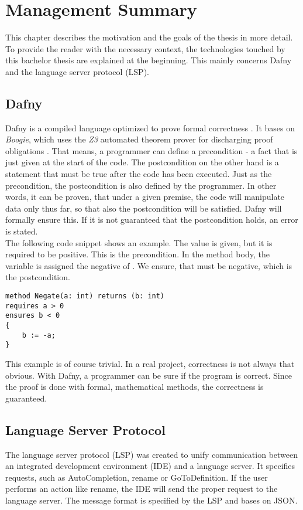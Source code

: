 \section{Management Summary}


\label{section:management_summary}
This chapter describes the motivation and the goals of the thesis in more detail.
To provide the reader with the necessary context, the technologies touched by this bachelor thesis are explained at the beginning.
This mainly concerns Dafny and the language server protocol (LSP).

\subsection{Dafny}
\label{section:management_summary:dafny}
Dafny is a compiled language optimized to prove formal correctness \cite{dafnyWiki}.
It bases on \textit{Boogie}, which uses the \textit{Z3} automated theorem prover for discharging proof obligations \cite{dafnyWiki}.
That means, a programmer can define a precondition - a fact that is just given at the start of the code.
The postcondition on the other hand is a statement that must be true after the code has been executed.
Just as the precondition, the postcondition is also defined by the programmer.
In other words, it can be proven, that under a given premise, the code will manipulate data only thus far, so that also the postcondition will be satisfied.
Dafny will formally ensure this.
If it is not guaranteed that the postcondition holds, an error is stated.\\

The following code snippet shows an example.
The value  is given, but it is required to be positive.
This is the precondition.
In the method body, the variable  is assigned the negative of .
We ensure, that  must be negative, which is the postcondition.
\begin{lstlisting}[language=dafny, caption={Simple Dafny Example}, captionpos=b, label={lst:simpleDafnyExample}]
method Negate(a: int) returns (b: int)
requires a > 0
ensures b < 0
{
    b := -a;
}
\end{lstlisting}
This example is of course trivial.
In a real project, correctness is not always that obvious.
With Dafny, a programmer can be sure if the program is correct.
Since the proof is done with formal, mathematical methods, the correctness is guaranteed.\\


\subsection{Language Server Protocol}
The language server protocol (LSP) was created to unify communication between an integrated development environment (IDE) and a language server.
It specifies requests, such as AutoCompletion, rename or GoToDefinition.
If the user performs an action like rename, the IDE will send the proper request to the language server.
The message format is specified by the LSP and bases on JSON.

